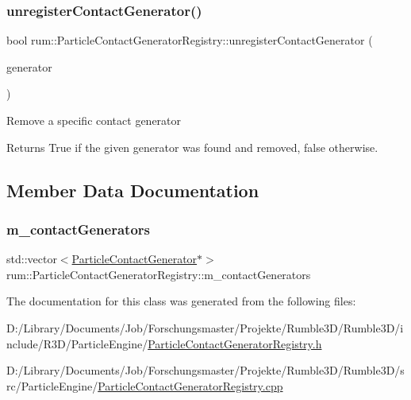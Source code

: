 \subsubsection{\texorpdfstring{unregister\+Contact\+Generator()}{unregisterContactGenerator()}}
{\footnotesize\ttfamily bool rum\+::\+Particle\+Contact\+Generator\+Registry\+::unregister\+Contact\+Generator (\begin{DoxyParamCaption}\item[{\mbox{\hyperlink{classrum_1_1_particle_contact_generator}{Particle\+Contact\+Generator}} $\ast$}]{generator }\end{DoxyParamCaption})}

Remove a specific contact generator \begin{DoxyReturn}{Returns}
True if the given generator was found and removed, false otherwise. 
\end{DoxyReturn}


\subsection{Member Data Documentation}
\mbox{\label{classrum_1_1_particle_contact_generator_registry_ab885a28d04666744a555a294b771f1ed}} 
\subsubsection{\texorpdfstring{m\+\_\+contact\+Generators}{m\_contactGenerators}}
{\footnotesize\ttfamily std\+::vector$<$\mbox{\hyperlink{classrum_1_1_particle_contact_generator}{Particle\+Contact\+Generator}}$\ast$$>$ rum\+::\+Particle\+Contact\+Generator\+Registry\+::m\+\_\+contact\+Generators\hspace{0.3cm}{\ttfamily [protected]}}



The documentation for this class was generated from the following files\+:\begin{DoxyCompactItemize}
\item 
D\+:/\+Library/\+Documents/\+Job/\+Forschungsmaster/\+Projekte/\+Rumble3\+D/\+Rumble3\+D/include/\+R3\+D/\+Particle\+Engine/\mbox{\hyperlink{_particle_contact_generator_registry_8h}{Particle\+Contact\+Generator\+Registry.\+h}}\item 
D\+:/\+Library/\+Documents/\+Job/\+Forschungsmaster/\+Projekte/\+Rumble3\+D/\+Rumble3\+D/src/\+Particle\+Engine/\mbox{\hyperlink{_particle_contact_generator_registry_8cpp}{Particle\+Contact\+Generator\+Registry.\+cpp}}\end{DoxyCompactItemize}
